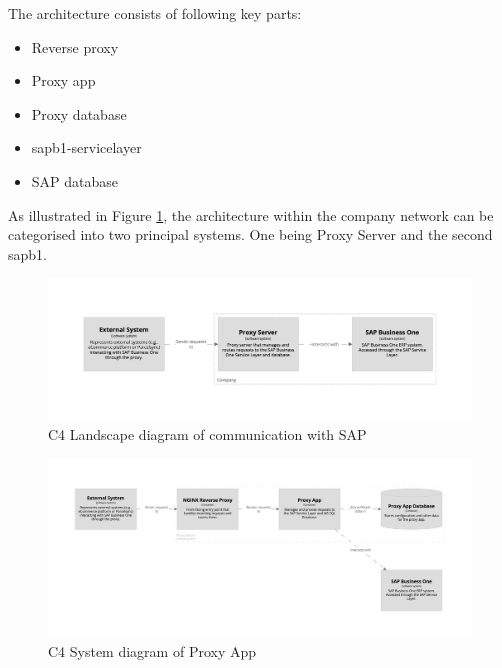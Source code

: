 The architecture consists of following key parts:
\begin{itemize}
    \item Reverse proxy
    \item Proxy app
    \item Proxy database
    \item \gls{sapb1-servicelayer}
    \item SAP database
\end{itemize}

As illustrated in Figure \ref{img07:structurizr:landscape}, the architecture within the company network can be categorised into two principal systems. One being Proxy Server and the second \gls{sapb1}.

\begin{figure}[H]\centering
\includegraphics[width=140mm]{img/chap07/fig_structurizr-landscape.png}
\caption{C4 Landscape diagram of communication with SAP}
\label{img07:structurizr:landscape}
\end{figure}

\begin{figure}[H]\centering
\includegraphics[width=140mm]{img/chap07/fig_structurizr-proxy-system.png}
\caption{C4 System diagram of Proxy App}
\label{img07:structurizr:system:proxy}
\end{figure}

